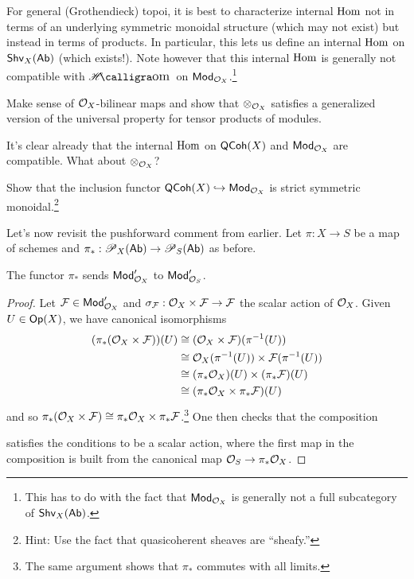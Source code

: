 \documentclass[11pt]{article}
\renewcommand{\F}{\mathcal{F}}
\begin{document}
\begin{remark}
For general (Grothendieck) topoi, it is best to characterize internal $\operatorname{Hom}$ not in terms of an underlying symmetric monoidal structure (which may not exist) but instead in terms of products. In particular, this lets us define an internal $\operatorname{Hom}$ on $\operatorname{\mathsf{Shv}}_X(\operatorname{\mathsf{Ab}})$ (which exists!). Note however that this internal $\operatorname{Hom}$ is generally not compatible with $\HHom$ on $\operatorname{\mathsf{Mod}}_{\mathcal{O}_X}$.\footnote{This has to do with the fact that $\operatorname{\mathsf{Mod}}_{\mathcal{O}_X}$ is generally not a full subcategory of $\operatorname{\mathsf{Shv}}_X(\operatorname{\mathsf{Ab}})$.} 
\end{remark}

\begin{exercise}
Make sense of $\mathcal{O}_X$-bilinear maps and show that $\otimes_{\mathcal{O}_X}$ satisfies a generalized version of the universal property for tensor products of modules.
\end{exercise}

It's clear already that the internal $\operatorname{Hom}$ on $\operatorname{\mathsf{QCoh}}(X)$ and $\operatorname{\mathsf{Mod}}_{\mathcal{O}_X}$ are compatible. What about $\otimes_{\mathcal{O}_X}$?

\begin{exercise}
Show that the inclusion functor $\operatorname{\mathsf{QCoh}}(X)\hookrightarrow\operatorname{\mathsf{Mod}}_{\mathcal{O}_X}$ is strict symmetric monoidal.\footnote{Hint: Use the fact that quasicoherent sheaves are ``sheafy.''}
\end{exercise}

Let's now revisit the pushforward comment from earlier. Let $\pi: X\to S$ be a map of schemes and $\pi_*: \operatorname{\mathscr{P}}_X(\operatorname{\mathsf{Ab}})\to\operatorname{\mathscr{P}}_S(\operatorname{\mathsf{Ab}})$ as before. 

\begin{proposition}
The functor $\pi_*$ sends $\operatorname{\mathsf{Mod}}'_{\mathcal{O}_X}$ to $\operatorname{\mathsf{Mod}}'_{\mathcal{O}_S}$.
\end{proposition}

\begin{proof}
Let $\F\in\Mod'_{\O_X}$ and $\sigma_{\F}: \O_X\times\F\to\F$ the scalar action of $\mathcal{O}_X$. Given $U\in\operatorname{\mathsf{Op}}(X)$, we have canonical isomorphisms
\begin{align*}
(\pi_*(\O_X\times\F))(U)
&\iso(\O_X\times\F)(\pi^{-1}(U)) \\
&\iso\O_X(\pi^{-1}(U))\times\F(\pi^{-1}(U)) \\
&\iso(\pi_*\O_X)(U)\times(\pi_*\F)(U) \\
&\iso(\pi_*\O_X\times\pi_*\F)(U)
\end{align*}
and so $\pi_*(\O_X\times\F)\iso\pi_*\O_X\times\pi_*\F$.\footnote{The same argument shows that $\pi_*$ commutes with all limits.} One then checks that the composition
\begin{center}
\end{center}
satisfies the conditions to be a scalar action, where the first map in the composition is built from the canonical map $\mathcal{O}_S\to\pi_*\mathcal{O}_X$.
\end{proof}
\end{document}
